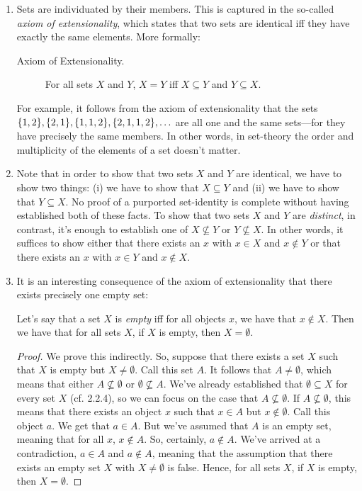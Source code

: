 \begin{enumerate}[{\thesection}.1]


\item Sets are individuated by their members. This is captured in the so-called \emph{axiom of extensionality}, which states that two sets are identical iff they have exactly the same elements. More formally:
\begin{description}
	\item[Axiom of Extensionality.] For all sets $X$ and $Y$, $X=Y$ iff $X\subseteq Y$ and $Y\subseteq X$. 
\end{description}
	For example, it follows from the axiom of extensionality that the sets $\{1,2\},\{2,1\}, \{1,1,2\},\{2,1,1,2\},\mathellipsis$ are all one and the same sets---for they have precisely the same members. In other words, in set-theory the order and multiplicity of the elements of a set doesn't matter. 
	
	\item Note that in order to show that two sets $X$ and $Y$ are identical, we have to show two things: (i) we have to show that $X\subseteq Y$ and (ii) we have to show that $Y\subseteq X$. No proof of a purported set-identity is complete without having established both of these facts. To show that two sets $X$ and $Y$ are \emph{distinct}, in contrast, it's enough to establish one of $X\nsubseteq Y$ or $Y\nsubseteq X$. In other words, it suffices to show either that there exists an $x$ with $x\in X$ and $x\notin Y$ or that there exists an $x$ with $x\in Y$ and $x\notin X$.

\item It is an interesting consequence of the axiom of extensionality that there exists precisely one empty set:
\begin{proposition}
Let's say that a set $X$ is \emph{empty} iff for all objects $x$, we have that $x\notin X$. Then we have that for all sets $X$, if $X$ is empty, then $X=\emptyset$.
\end{proposition}
\begin{proof}
We prove this indirectly. So, suppose that there exists a set $X$ such that $X$ is empty but $X\neq\emptyset$. Call this set $A$. It follows that $A\neq \emptyset$, which means that either $A\nsubseteq \emptyset$ or $\emptyset\nsubseteq A$. We've already established that $\emptyset\subseteq X$ for every set $X$ (cf. 2.2.4), so we can focus on the case that $A\nsubseteq \emptyset$. If $A\nsubseteq \emptyset$, this means that there exists an object $x$ such that $x\in A$ but $x\notin \emptyset$. Call this object $a$. We get that $a\in A$. But we've assumed that $A$ is an empty set, meaning that for all $x$, $x\notin A$. So, certainly, $a\notin A$. We've arrived at a contradiction, $a\in A$ and $a\notin A$, meaning that the assumption that  there exists an empty set $X$ with $X\neq\emptyset$ is false. Hence, for all sets $X$, if $X$ is empty, then $X=\emptyset$.
\end{proof}

\end{enumerate}

